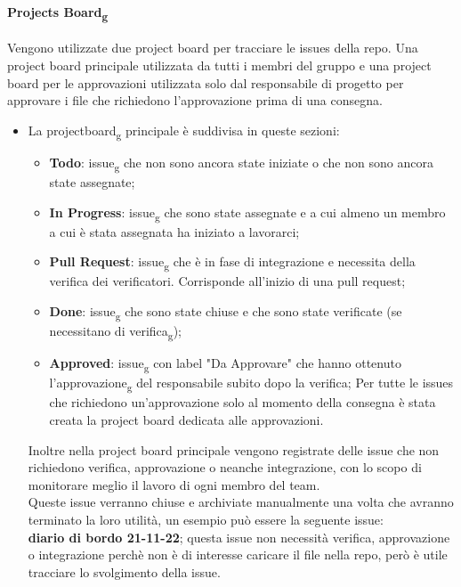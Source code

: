 \paragraph{Projects Board\textsubscript{g}}
Vengono utilizzate due project board per tracciare le issues della repo.
Una project board principale utilizzata da tutti i membri del gruppo e una project board per le approvazioni utilizzata solo dal responsabile di progetto per approvare i file che richiedono l'approvazione prima di una consegna.

\begin{itemize}
	\item La projectboard\textsubscript{g} principale è suddivisa in queste sezioni:
	\begin{itemize}
		\item \textbf{Todo}: issue\textsubscript{g} che non sono ancora state iniziate o che non sono ancora state assegnate;
		\item \textbf{In Progress}: issue\textsubscript{g} che sono state assegnate e a cui almeno un membro a cui è stata assegnata ha iniziato a lavorarci;
		\item \textbf{Pull Request}: issue\textsubscript{g} che è in fase di integrazione e necessita della verifica dei verificatori. Corrisponde all'inizio di una pull request;
		\item \textbf{Done}: issue\textsubscript{g} che sono state chiuse e che sono state verificate (se necessitano di verifica\textsubscript{g});
		\item \textbf{Approved}: issue\textsubscript{g} con label "Da Approvare" che hanno ottenuto l'approvazione\textsubscript{g} del responsabile subito dopo la verifica;
		Per tutte le issues che richiedono un'approvazione solo al momento della consegna è stata creata la project board dedicata alle approvazioni.
	\end{itemize}
	Inoltre nella project board principale vengono registrate delle issue che non richiedono verifica, approvazione o neanche integrazione, con lo scopo di monitorare meglio il lavoro di ogni membro del team.\\
Queste issue verranno chiuse e archiviate manualmente una volta che avranno terminato la loro utilità, un esempio può essere la seguente issue:\\
\textbf{diario di bordo 21-11-22}; questa issue non necessità verifica, approvazione o integrazione perchè non è di interesse caricare il file nella repo, però è utile tracciare lo svolgimento della issue.


\end{itemize}
